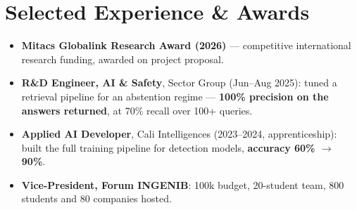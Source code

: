 \documentclass[10pt, letterpaper]{article}
\begin{document}
\section{Selected Experience \& Awards}
\begin{itemize}
    \item \textbf{Mitacs Globalink Research Award (2026)} --- competitive international research funding, awarded on project proposal.
    \item \textbf{R\&D Engineer, AI \& Safety}, Sector Group (Jun--Aug 2025): tuned a retrieval pipeline for an abstention regime --- \textbf{100\% precision on the answers returned}, at 70\% recall over 100+ queries.
    \item \textbf{Applied AI Developer}, Cali Intelligences (2023--2024, apprenticeship): built the full training pipeline for detection models, \textbf{accuracy 60\% $\to$ 90\%}.
    \item \textbf{Vice-President, Forum INGENIB}: \texteuro{}100k budget, 20-student team, 800 students and 80 companies hosted.
\end{itemize}
\end{document}
